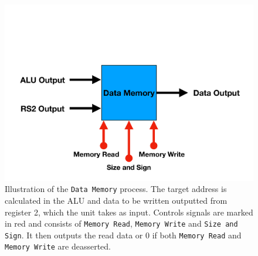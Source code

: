         \begin{figure}[h!]
            \centering
            \includegraphics[scale=0.29]{pictures/DM.pdf}
            \caption{Illustration of the \texttt{Data Memory} process. The target address is calculated in the ALU and data to be written outputted from register 2, which the unit takes as input. Controls signals are marked in red and consists of \texttt{Memory Read}, \texttt{Memory Write} and \texttt{Size and Sign}. It then outputs the read data or 0 if both \texttt{Memory Read} and \texttt{Memory Write} are deasserted.}
            \label{fig:DM}
        \end{figure}
    
